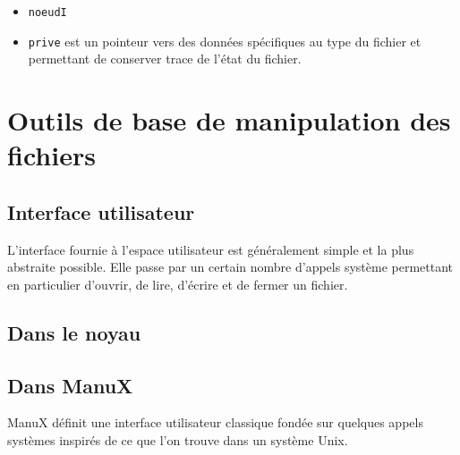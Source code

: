 \begin{itemize}
   \item \lstinline!noeudI! 
   \item \lstinline!prive! est un pointeur vers des données
     spécifiques au type du fichier et permettant de conserver trace
     de l'état du fichier.
\end{itemize}
   

%
\section{Outils de base de manipulation des fichiers}

%
\subsection{Interface utilisateur}

   L'interface fournie à l'espace utilisateur est généralement simple
et la plus abstraite possible. Elle passe par un certain nombre
d'appels système permettant en particulier d'ouvrir, de lire, d'écrire
et de fermer un fichier.

%
\subsection{Dans le noyau}

%
\subsection{Dans ManuX}

   ManuX définit une interface utilisateur classique fondée sur
quelques appels systèmes inspirés de ce que l'on trouve dans un
système Unix.

%
